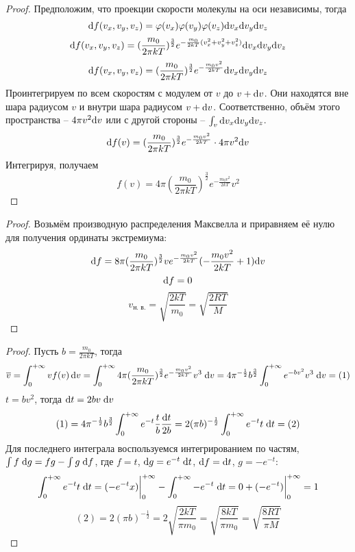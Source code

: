 \begin{proof}
	Предположим, что проекции скорости молекулы на оси независимы, тогда
	\[ \text{d} f(v_x, v_y, v_z) = \varphi(v_x) \varphi(v_y) \varphi(v_z) \text{d} v_x \text{d} v_y \text{d} v_z \]
	\[ \text{d} f(v_x, v_y, v_z) = (\frac{m_0}{2 \pi k T})^{\frac{3}{2}} e^{-\frac{m_0}{2 k T}(v_x^2+v_y^2+v_z^2)} \text{d} v_x \text{d} v_y \text{d} v_z \]
	\[ \text{d} f(v_x, v_y, v_z) = (\frac{m_0}{2 \pi k T})^{\frac{3}{2}} e^{-\frac{m_0 v^2}{2 k T}} \text{d} v_x \text{d} v_y \text{d} v_z \]
	Проинтегрируем по всем скоростям с модулем от $v$ до $v + \text{d} v$. Они находятся вне шара радиусом $v$ и внутри шара радиусом $v + \text{d} v$. Соответственно, объём этого пространства -- $4 \pi v^2 \text{d} v$ или с другой стороны -- $\int_v \text{d} v_x \text{d} v_y \text{d} v_z$.
	\[ \text{d} f(v) = (\frac{m_0}{2 \pi k T})^{\frac{3}{2}} e^{-\frac{m_0 v^2}{2 k T}} \cdot 4 \pi v^2 \text{d} v \]
	Интегрируя, получаем
	\[ f(v) = 4 \pi (\frac{m_0}{2\pi k T})^{\frac{3}{2}} e^{-\frac{m_0 v^2}{2 k T}} v^2 \]
\end{proof}

\begin{proof}
	Возьмём производную распределения Максвелла и приравняем её нулю для получения ординаты экстремиума:
	\[\text{d} f = 8\pi(\frac{m_0}{2\pi k T})^{\frac{3}{2}}ve^{-\frac{m_0v^2}{2 k T}}(-\frac{m_0 v^2}{2kT}+1) \text{d} v\]
	\[\text{d} f = 0\]
	\[v_{\text{н. в.}}=\sqrt{\frac{2kT}{m_0}}=\sqrt{\frac{2RT}{M}}\]
\end{proof}

\begin{proof}
	Пусть $b = \frac{m_0}{2 \pi k T}$, тогда
	\[ \overline{v} = \int_{0}^{+\infty} v f(v) \,\text{d} v =
	\int_{0}^{+\infty} 4 \pi (\frac{m_0}{2\pi k T})^{\frac{3}{2}} e^{-\frac{m_0 v^2}{2 k T}} v^3 \;\text{d} v =
	4 \pi^{-\frac{1}{2}} b^{\frac{3}{2}} \int_{0}^{+\infty} e^{-b v^2} v^3 \;\text{d} v = (1) \]
	$t = b v^2$, тогда $\text{d} t = 2 b v \;\text{d} v $
	\[ (1) = 4 \pi^{-\frac{1}{2}} b^{\frac{3}{2}} \int_{0}^{+\infty} e^{-t} \frac{t}{b} \frac{\text{d} t}{2 b} = 
	2 (\pi b)^{-\frac{1}{2}} \int_{0}^{+\infty} e^{-t} t \;\text{d} t = (2) \]
	Для последнего интеграла воспользуемся интегрированием по частям, $\int f \;\text{d} g = f g - \int g \;\text{d} f$, где $f = t$, $\text{d} g = e^{-t} \;\text{d} t$, $\text{d} f = \text{d} t$, $g = -e^{-t}$:
	\[ \int_{0}^{+\infty} e^{-t} t \;\text{d} t = (-e^{-t} x)\bigg|_{0}^{+\infty} - \int_{0}^{+\infty} -e^{-t} \;\text{d} t = 
	0 + (-e^{-t})\bigg|_{0}^{+\infty} = 1 \]
	\[ (2) = 2 (\pi b)^{-\frac{1}{2}} = 2 \sqrt{\frac{2 k T}{\pi m_0}} = \sqrt{\frac{8 k T}{\pi m_0}} = \sqrt{\frac{8RT}{\pi M}} \]
\end{proof}

